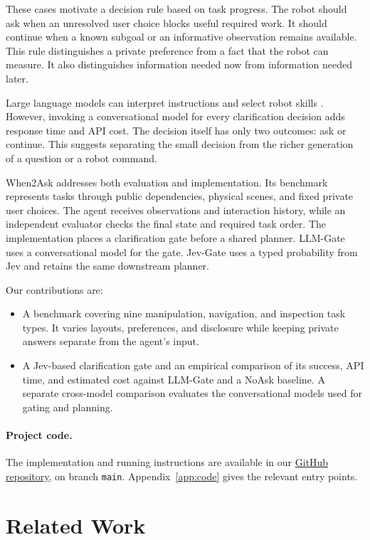 \documentclass{article}
\begin{document}
These cases motivate a decision rule based on task progress. The robot should
ask when an unresolved user choice blocks useful required work. It should
continue when a known subgoal or an informative observation remains available.
This rule distinguishes a private preference from a fact that the robot can
measure. It also distinguishes information needed now from information needed
later.

Large language models can interpret instructions and select robot skills
\citep{ahn2022saycan,liang2022code}. However, invoking a conversational model
for every clarification decision adds response time and API cost. The decision
itself has only two outcomes: ask or continue. This suggests separating the
small decision from the richer generation of a question or a robot command.

When2Ask addresses both evaluation and implementation. Its benchmark represents
tasks through public dependencies, physical scenes, and fixed private user
choices. The agent receives observations and interaction history, while an
independent evaluator checks the final state and required task order.
The implementation places a clarification gate before a shared planner.
LLM-Gate uses a conversational model for the gate. Jev-Gate uses a typed
probability from Jev and retains the same downstream planner.

Our contributions are:
\begin{itemize}
  \item A benchmark covering nine manipulation, navigation, and inspection
  task types. It varies layouts, preferences, and disclosure while keeping
  private answers separate from the agent's input.
  \item A Jev-based clarification gate and an empirical comparison of its
  success, API time, and estimated cost against LLM-Gate and a NoAsk baseline.
  A separate cross-model comparison evaluates the conversational models used
  for gating and planning.
\end{itemize}

\paragraph{Project code.}
The implementation and running instructions are available in our
\href{https://github.com/liangjunyi010/when2ask}
{GitHub repository},
on branch \texttt{main}.
Appendix~\ref{app:code} gives the relevant entry points.

\section{Related Work}
\end{document}
